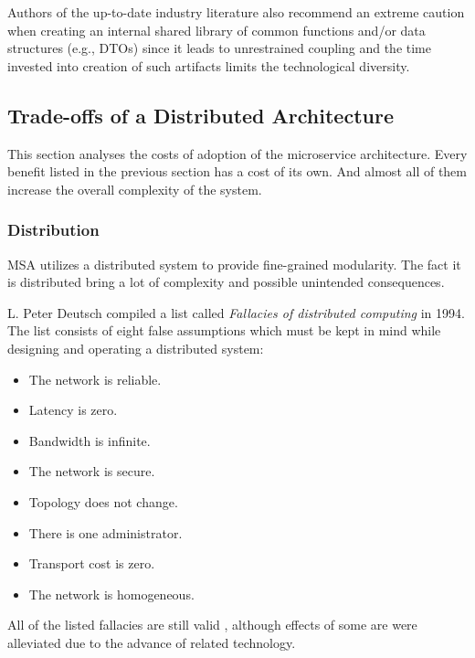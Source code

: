 \documentclass[thesis=M,english,hidelinks]{FITthesis}[2012/10/20]
\begin{document}
Authors of the up-to-date industry literature \cite{ms-building-ms, ms-evolutionary-arch, ms-ca} also recommend an extreme caution when creating an internal shared library of common functions and/or data structures (e.g., \acrshort{DTO}s) since it leads to unrestrained coupling and the time invested into creation of such artifacts limits the technological diversity. 

\subsection{Trade-offs of a Distributed Architecture}
\label{sec:tradeoffs}

This section analyses the costs of adoption of the microservice architecture. Every benefit listed in the previous section has a cost of its own. And almost all of them increase the overall complexity of the system.

\subsubsection{Distribution}
\label{sec:fallacies}
\acrshort{MSA} utilizes a distributed system to provide fine-grained modularity. The fact it is distributed bring a lot of complexity and possible unintended consequences. 

L. Peter Deutsch compiled a list called \textit{Fallacies of distributed computing} \cite{devops-fallacies-wiki} in 1994. The list consists of eight false assumptions which must be kept in mind while designing and operating a distributed system: 
\begin{multicols}{2}
    \begin{itemize}
        \item The network is reliable.
        \item Latency is zero.
        \item Bandwidth is infinite.
        \item The network is secure.
        \item Topology does not change.
        \item There is one administrator.
        \item Transport cost is zero.
        \item The network is homogeneous.
    \end{itemize}
\end{multicols}

All of the listed fallacies are still valid \cite{devops-fallacies}, although effects of some are were alleviated due to the advance of related technology.
\end{document}
